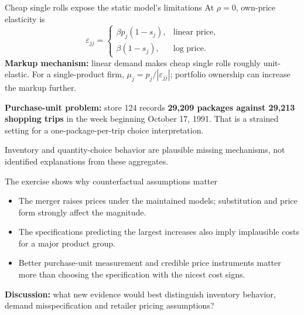 \documentclass[aspectratio=169,11pt]{beamer}
\begin{document}
\begin{frame}{Cheap single rolls expose the static model's limitations}
At $\rho=0$, own-price elasticity is
\[
\varepsilon_{jj}=\begin{cases}
\beta p_j(1-s_j),&\text{linear price},\\
\beta(1-s_j),&\text{log price}.
\end{cases}
\]
\small
\textbf{Markup mechanism:} linear demand makes cheap single rolls roughly unit-elastic. For a single-product firm, $\mu_j=p_j/|\varepsilon_{jj}|$; portfolio ownership can increase the markup further.\par\medskip
\textbf{Purchase-unit problem:} store 124 records \textbf{29,209 packages against 29,213 shopping trips} in the week beginning October 17, 1991. That is a strained setting for a one-package-per-trip choice interpretation.\par\medskip
Inventory and quantity-choice behavior are plausible missing mechanisms, not identified explanations from these aggregates.
\end{frame}

\begin{frame}{The exercise shows why counterfactual assumptions matter}
\begin{itemize}\setlength\itemsep{4mm}
\item The merger raises prices under the maintained models; substitution and price form strongly affect the magnitude.
\item The specifications predicting the largest increases also imply implausible costs for a major product group.
\item Better purchase-unit measurement and credible price instruments matter more than choosing the specification with the nicest cost signs.
\end{itemize}
\medskip
\textbf{Discussion:} what new evidence would best distinguish inventory behavior, demand misspecification and retailer pricing assumptions?
\end{frame}
\end{document}
